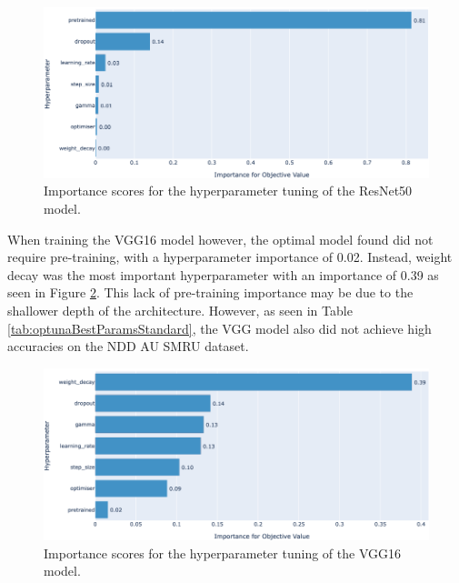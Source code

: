\begin{figure}
	\begin{center}
		\includegraphics[scale=0.4]{Chapter7/figs/resnet50baseline-hyperparam-importance-optuna-updated.png}
	\end{center}
	\caption{Importance scores for the hyperparameter tuning of the ResNet50 model.}
	\label{fig:resnet50baseline-hyperparam-importance-optuna}
\end{figure}

When training the VGG16 model however, the optimal model found did not require pre-training, with a hyperparameter importance of 0.02. Instead, weight decay was the most important hyperparameter with an importance of 0.39 as seen in Figure \ref{fig:vgg16baseline-hyperparam-importance-optuna}. This lack of pre-training importance may be due to the shallower depth of the architecture. However, as seen in Table \ref{tab:optunaBestParamsStandard}, the VGG model also did not achieve high accuracies on the NDD AU SMRU dataset. 

\begin{figure}
	\begin{center}
		\includegraphics[scale=0.4]{Chapter7/figs/vgg16-baseline-hyperparam-importance-optuna-updated.png}
	\end{center}
	\caption{Importance scores for the hyperparameter tuning of the VGG16 model.}
	\label{fig:vgg16baseline-hyperparam-importance-optuna}
\end{figure}

